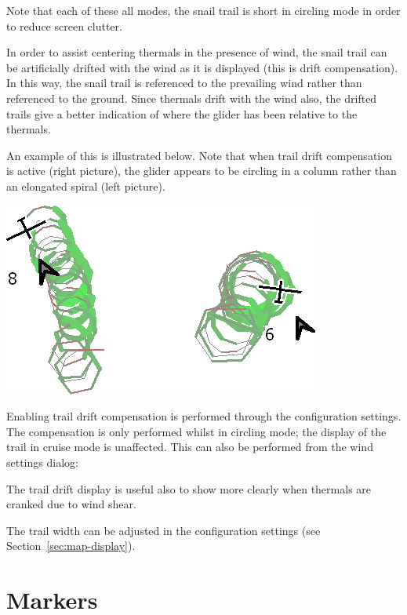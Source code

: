 \documentclass[a4paper,12pt]{refrep}
\begin{document}
Note that each of these all modes, the snail trail is short in
circling mode in order to reduce screen clutter.

In order to assist centering thermals in the presence of wind, the
snail trail can be artificially drifted with the wind as it is
displayed (this is drift compensation).  In this way, the snail trail
is referenced to the prevailing wind rather than referenced to the
ground.  Since thermals drift with the wind also, the drifted trails
give a better indication of where the glider has been relative to the
thermals.

An example of this is illustrated below.  Note that when trail drift
compensation is active (right picture), the glider appears to be
circling in a column rather than an elongated spiral (left picture).

\begin{center}
\includegraphics[angle=0,width=0.8\linewidth,keepaspectratio='true']{figures/traildrift.png}
\end{center}

Enabling trail drift compensation is performed through the
configuration settings.  The compensation is only performed whilst in
circling mode; the display of the trail in cruise mode is unaffected.
This can also be performed from the wind settings dialog:
\begin{quote}
\blink{}
\end{quote}

The trail drift display is useful also to show more clearly when thermals
are cranked due to wind shear.

The trail width can be adjusted in the configuration settings (see
Section~\ref{sec:map-display}).

\section{Markers}
\end{document}
